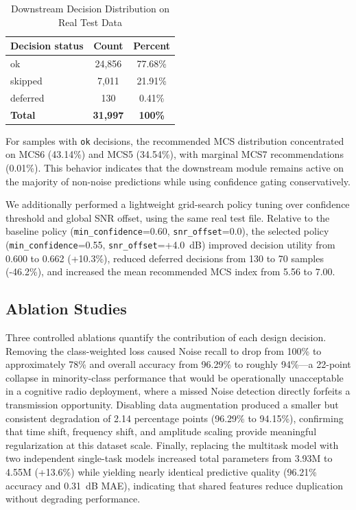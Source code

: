 \documentclass[conference]{IEEEtran}
\begin{document}
\begin{table}[!t]
\centering
\caption{Downstream Decision Distribution on Real Test Data}
\label{tab:downstream_distribution}
\begin{tabular}{@{}lcc@{}}
\toprule
\textbf{Decision status} & \textbf{Count} & \textbf{Percent} \\
\midrule
ok      & 24,856 & 77.68\% \\
skipped & 7,011  & 21.91\% \\
deferred& 130    & 0.41\% \\
\midrule
\textbf{Total} & \textbf{31,997} & \textbf{100\%} \\
\bottomrule
\end{tabular}
\end{table}

For samples with \texttt{ok} decisions, the recommended MCS distribution concentrated on MCS6 (43.14\%) and MCS5 (34.54\%), with marginal MCS7 recommendations (0.01\%). This behavior indicates that the downstream module remains active on the majority of non-noise predictions while using confidence gating conservatively.

We additionally performed a lightweight grid-search policy tuning over confidence threshold and global SNR offset, using the same real test file. Relative to the baseline policy (\texttt{min\_confidence}=0.60, \texttt{snr\_offset}=0.0), the selected policy (\texttt{min\_confidence}=0.55, \texttt{snr\_offset}=+4.0~dB) improved decision utility from 0.600 to 0.662 (+10.3\%), reduced deferred decisions from 130 to 70 samples (-46.2\%), and increased the mean recommended MCS index from 5.56 to 7.00.

\subsection{Ablation Studies}

Three controlled ablations quantify the contribution of each design decision. Removing the class-weighted loss caused Noise recall to drop from 100\% to approximately 78\% and overall accuracy from 96.29\% to roughly 94\%---a 22-point collapse in minority-class performance that would be operationally unacceptable in a cognitive radio deployment, where a missed Noise detection directly forfeits a transmission opportunity. Disabling data augmentation produced a smaller but consistent degradation of 2.14 percentage points (96.29\% to 94.15\%), confirming that time shift, frequency shift, and amplitude scaling provide meaningful regularization at this dataset scale. Finally, replacing the multitask model with two independent single-task models increased total parameters from 3.93M to 4.55M (+13.6\%) while yielding nearly identical predictive quality (96.21\% accuracy and 0.31~dB MAE), indicating that shared features reduce duplication without degrading performance.
\end{document}

